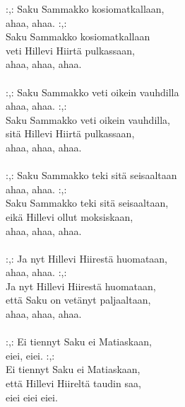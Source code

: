 
            :,: Saku Sammakko kosiomatkallaan, \\
            ahaa, ahaa. :,: \\
            Saku Sammakko kosiomatkallaan \\
            veti Hillevi Hiirtä pulkassaan, \\
            ahaa, ahaa, ahaa. \\
\hspace{10mm} \\
            :,: Saku Sammakko veti oikein vauhdilla \\
            ahaa, ahaa. :,: \\
            Saku Sammakko veti oikein vauhdilla, \\
            sitä Hillevi Hiirtä pulkassaan, \\
            ahaa, ahaa, ahaa. \\
\hspace{10mm} \\
            :,: Saku Sammakko teki sitä seisaaltaan  \\
            ahaa, ahaa. :,:  \\
            Saku Sammakko teki sitä seisaaltaan,  \\
            eikä Hillevi ollut moksiskaan, \\
            ahaa, ahaa, ahaa. \\
\hspace{10mm} \\
            :,: Ja nyt Hillevi Hiirestä huomataan, \\
            ahaa, ahaa. :,:  \\
            Ja nyt Hillevi Hiirestä huomataan,  \\
            että Saku on vetänyt paljaaltaan,  \\
            ahaa, ahaa, ahaa. \\
\hspace{10mm} \\
            :,: Ei tiennyt Saku ei Matiaskaan, \\
            eiei, eiei. :,: \\
            Ei tiennyt Saku ei Matiaskaan,  \\
            että Hillevi Hiireltä taudin saa, \\
            eiei eiei eiei. \\
\hspace{10mm} \\
